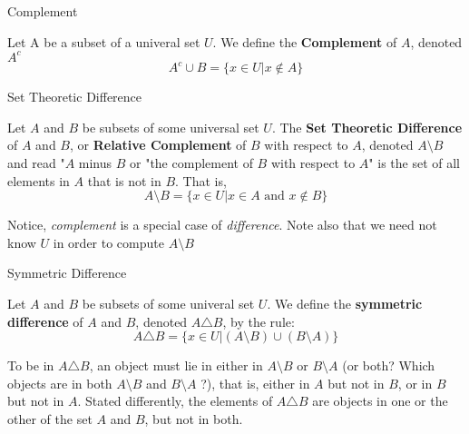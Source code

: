 \begin{definition}
Complement \\
\begin{tcolorbox}
    Let A be a subset of a univeral set $U$. We define the \textbf{Complement} of $A$, denoted $A^c$
    \begin{equation*}
            A^c \cup B = \{x \in U | x \notin A \}
        \end{equation*}
\end{tcolorbox}
\end{definition}

\begin{definition}
Set Theoretic Difference \\
\begin{tcolorbox}
    Let $A$ and $B$ be subsets of some universal set $U$. The \textbf{Set Theoretic Difference} of $A$ and $B$, or \textbf{Relative Complement} of $B$ with respect to $A$, denoted $A \setminus B$ and read "$A$ minus $B$ or "the complement of $B$ with respect to $A$" is the set of all elements in $A$ that is not in $B$. That is, \\
     \begin{equation*}
            A \setminus B = \{x \in U | x \in A \text{ and } x \notin B \}
        \end{equation*}
\end{tcolorbox}
Notice, \textit{complement} is a special case of \textit{difference}. Note also that  we need not know $U$ in order to compute  $A \setminus B$
\end{definition}

\begin{definition}
Symmetric Difference \\

\begin{tcolorbox}
    Let $A$ and $B$ be subsets of some univeral set $U$. We define the  \textbf{symmetric difference} of $A$ and $B$, denoted $A \triangle B$, by the rule:
     \begin{equation*}
            A \triangle B = \{x \in U | (A \setminus B) \cup (B \setminus A) \}
        \end{equation*}
\end{tcolorbox}    
    
To be in $A \triangle B$, an object must lie in either in $A \setminus B$ or $B \setminus A$ (or both? Which objects are in both $A \setminus B$ and $B \setminus A$ ?), that is, either in $A$ but not in $B$, or in $B$ but not in $A$. Stated differently, the elements of $A \triangle B$ are objects in one or the other of the set $A$ and $B$, but not in both. 
\end{definition}

